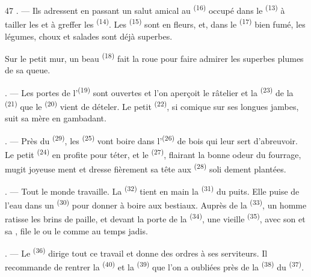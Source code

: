 \begin{VUpage}[49]{47}
. --- Ils adressent en passant un salut amical au\nl
{}\textsuperscript{(16)} occupé dans le \textsuperscript{(13)} à tailler les\nl
{} et à greffer les \textsuperscript{(14)}. Les\nl
{}\textsuperscript{(15)} sont en fleurs, et, dans le \textsuperscript{(17)}\nl
bien fumé, les légumes, choux et salades sont déjà\nl
superbes.

\VUblancAlinea
Sur le petit mur, un beau \textsuperscript{(18)} fait la roue\nl
pour faire admirer les superbes plumes de sa queue.

. --- Les portes de l'\textsuperscript{(19)} sont ouvertes et l'on\nl
aperçoit le râtelier et la \textsuperscript{(23)} de la \textsuperscript{(21)}\nl
que le \textsuperscript{(20)} vient de dételer. Le\nl
petit \textsuperscript{(22)}, si comique sur ses longues jambes,\nl
suit sa mère en gambadant.

. --- Près du \textsuperscript{(29)}, les \textsuperscript{(25)} vont boire\nl
dans l'\textsuperscript{(26)} de bois qui leur sert d'abreuvoir. Le\nl
petit \textsuperscript{(24)} en profite pour téter, et le \textsuperscript{(27)},\nl
flairant la bonne odeur du fourrage, mugit joyeuse\cc
ment et dresse fièrement sa tête aux \textsuperscript{(28)} soli\cc
dement plantées.

. --- Tout le monde travaille. La \textsuperscript{(32)} tient\nl
en main la \textsuperscript{(31)} du puits. Elle puise de l'eau dans\nl
un \textsuperscript{(30)} pour donner à boire aux bestiaux. Auprès\nl
de la \textsuperscript{(33)}, un homme ratisse les brins de\nl
paille, et devant la porte de la \cc
{}\textsuperscript{(34)}, une vieille \textsuperscript{(35)}, avec son  et sa\nl
{}, file le  ou le  comme au\nl
temps jadis.

. --- Le \textsuperscript{(36)} dirige tout ce travail et donne\nl
des ordres à ses serviteurs. Il recommande de rentrer\nl
la \textsuperscript{(40)} et la \textsuperscript{(39)} que l'on a oubliées près\nl
de la \textsuperscript{(38)} du \textsuperscript{(37)}.


\end{VUpage}
